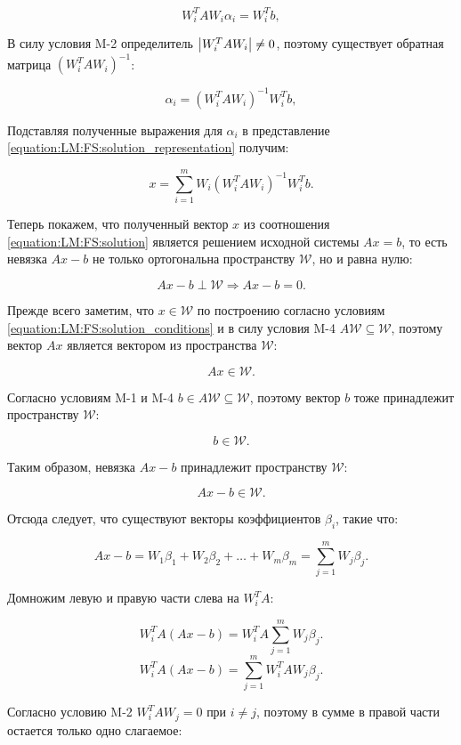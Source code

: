 $$
	W_i^T A W_i \alpha_i = W_i^T b,
$$

В силу условия M-2 определитель $\left | W_i^T A W_i \right | \neq 0$, поэтому существует обратная матрица
$ \left ( W_i^T A W_i \right ) ^{-1} $:

$$
	\alpha_i = \left ( W_i^T A W_i \right ) ^{-1} W_i^T b,
$$

Подставляя полученные выражения для $\alpha_i$ в представление \ref{equation:LM:FS:solution_representation} получим:

\begin{equation} \label{equation:LM:FS:solution}
	x = \sum_{i=1}^m W_i \left ( W_i^T A W_i \right ) ^{-1} W_i^T b.
\end{equation}

Теперь покажем, что полученный вектор $x$ из соотношения \ref{equation:LM:FS:solution} является решением исходной системы $Ax = b$,
то есть невязка $Ax - b$ не только ортогональна пространству $\mathcal W$, но и равна нулю:

$$
	Ax - b \perp \mathcal W \Rightarrow Ax - b = 0.
$$

Прежде всего заметим, что $x \in \mathcal W$ по построению согласно условиям \ref{equation:LM:FS:solution_conditions} и в силу условия
M-4 $A \mathcal W \subseteq \mathcal W$, поэтому вектор $Ax$ является вектором из пространства $\mathcal W$:

$$
	Ax \in \mathcal W.
$$

Согласно условиям M-1 и M-4 $b \in A \mathcal W \subseteq \mathcal W$, поэтому вектор $b$ тоже принадлежит пространству $\mathcal W$:

$$
	b \in \mathcal W.
$$

Таким образом, невязка $Ax - b$ принадлежит пространству $\mathcal W$:

$$
	Ax - b \in \mathcal W.
$$

Отсюда следует, что существуют векторы коэффициентов $\beta_i$, такие что:

\begin{equation} \label{equation:LM:FS:residual_representation}
	Ax - b = W_1 \beta_1 + W_2 \beta_2 + \dots + W_m \beta_m = \sum_{j=1}^m W_j \beta_j.
\end{equation}

Домножим левую и правую части слева на $W_i^T A$:

$$
	W_i^T A ( Ax - b ) = W_i^T A \sum_{j=1}^m W_j \beta_j.
$$
$$
	W_i^T A ( Ax - b ) = \sum_{j=1}^m W_i^T A W_j \beta_j.
$$

Согласно условию M-2 $W_i^T A W_j = 0$ при $i \neq j$, поэтому в сумме в правой части остается только одно слагаемое:

